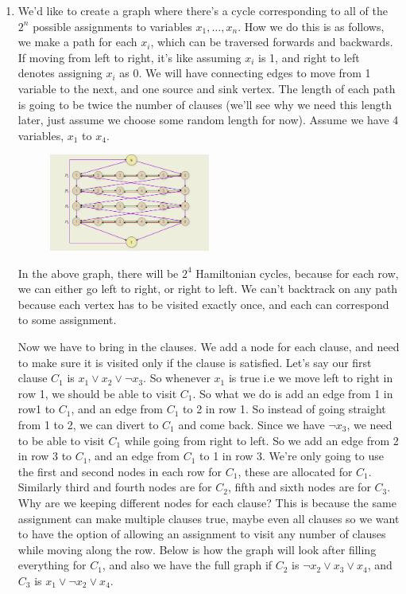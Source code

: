 \documentclass[12pt]{report}
\begin{document}
\begin{enumerate}[label=\textbf{\arabic*.}]
    \item We'd like to create a graph where there's a cycle corresponding to all of the $2^n$ possible assignments to variables $x_1, \dots, x_n$.
    How we do this is as follows, we make a path for each $x_i$, which can be traversed forwards and backwards. If moving from left to right, it's
    like assuming $x_i$ is 1, and right to left denotes assigning $x_i$ as 0. We will have connecting edges to move from 1 variable to the next,
    and one source and sink vertex. The length of each path is going to be twice the number of clauses (we'll see why we need this length later,
    just assume we choose some random length for now). Assume we have 4 variables, $x_1$ to $x_4$.

    \begin{figure}[H]
        \centering
        \includegraphics[width=0.5\textwidth]{Hamiltonian1.png}  
    \end{figure}

    In the above graph, there will be $2^4$ Hamiltonian cycles, because for each row, we can either go left to right, or right to left. We can't 
    backtrack on any path because each vertex has to be visited exactly once, and each can correspond to some assignment.

    Now we have to bring in the clauses. We add a node for each clause, and need to make sure it is visited only if the clause is satisfied.
    Let's say our first clause $C_1$ is $x_1 \lor x_2 \lor \lnot x_3$. So whenever $x_1$ is true i.e we move left to right in row 1, we should 
    be able to visit $C_1$. So what we do is add an edge from 1 in row1 to $C_1$, and an edge from $C_1$ to 2 in row 1. So instead of going straight
    from 1 to 2, we can divert to $C_1$ and come back. Since we have $\lnot x_3$, we need to be able to visit $C_1$ while going from right to left.
    So we add an edge from 2 in row 3 to $C_1$, and an edge from $C_1$ to 1 in row 3. We're only going to use the first and second nodes in each row 
    for $C_1$, these are allocated for $C_1$. Similarly third and fourth nodes are for $C_2$, fifth and sixth nodes are for $C_3$. Why are we keeping
    different nodes for each clause? This is because the same assignment can make multiple clauses true, maybe even all clauses so we want to have
    the option of allowing an assignment to visit any number of clauses while moving along the row. Below is how the graph will look after filling
    everything for $C_1$, and also we have the full graph if $C_2$ is $\lnot x_2 \lor x_3 \lor x_4$, and $C_3$ is $x_1 \lor \lnot x_2 \lor x_4$.


\end{enumerate}
\end{document}
